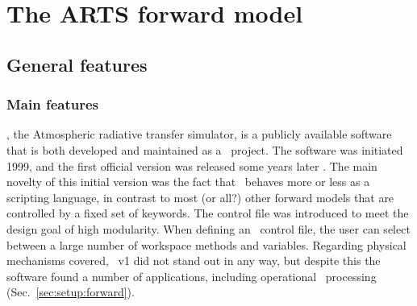 \chapter{The ARTS forward model}
\label{chapter:arts}


\section{General features}
\label{sec:arts:features}

\subsection{Main features}
%
\ARTS, the Atmospheric radiative transfer simulator, is a publicly available
software that is both developed and maintained as a \FOSSlong\ project. The
software was initiated 1999, and the first official version was released some
years later \citep{buehler:artst:05}. The main novelty of this initial version was the
fact that \ARTS\ behaves more or less as a scripting language, in contrast to
most (or all?) other forward models that are controlled by a fixed set of
keywords. The control file was introduced to meet the design goal of high
modularity. When defining an \ARTS\ control file, the user can select between a
large number of workspace methods and variables. Regarding physical mechanisms
covered, \ARTS~v1 did not stand out in any way, but despite this the software
found a number of applications, including operational \SMR\ processing
(Sec.~\ref{sec:setup:forward}).

